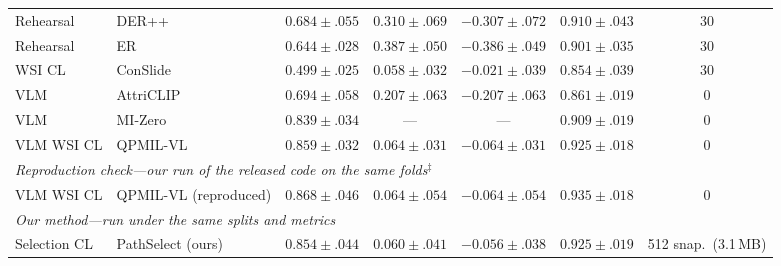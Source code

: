 \documentclass{article}
\begin{document}
\begin{table}[!t]
\begin{tabular}{llccccc}
Rehearsal & DER++ \cite{buzzega2020derpp} & $0.684{\pm}.055$ & $0.310{\pm}.069$ & $-0.307{\pm}.072$ & $0.910{\pm}.043$ & 30 \\
Rehearsal & ER \cite{chaudhry2019er} & $0.644{\pm}.028$ & $0.387{\pm}.050$ & $-0.386{\pm}.049$ & $0.901{\pm}.035$ & 30 \\
WSI CL & ConSlide \cite{huang2023conslide} & $0.499{\pm}.025$ & $0.058{\pm}.032$ & $-0.021{\pm}.039$ & $0.854{\pm}.039$ & 30 \\
VLM & AttriCLIP \cite{wang2023attriclip} & $0.694{\pm}.058$ & $0.207{\pm}.063$ & $-0.207{\pm}.063$ & $0.861{\pm}.019$ & 0 \\
VLM & MI-Zero \cite{lu2023mizero} & $0.839{\pm}.034$ & --- & --- & $0.909{\pm}.019$ & 0 \\
VLM WSI CL & QPMIL-VL \cite{gou2025qpmil} & $0.859{\pm}.032$ & $0.064{\pm}.031$ & $-0.064{\pm}.031$ & $0.925{\pm}.018$ & 0 \\
\midrule
\multicolumn{7}{l}{\emph{Reproduction check---our run of the released code on the same folds$^\ddagger$}} \\
VLM WSI CL & QPMIL-VL (reproduced) & $0.868{\pm}.046$ & $0.064{\pm}.054$ & $-0.064{\pm}.054$ & $0.935{\pm}.018$ & 0 \\
\midrule
\multicolumn{7}{l}{\emph{Our method---run under the same splits and metrics}} \\
Selection CL & PathSelect (ours) & $0.854{\pm}.044$ & $0.060{\pm}.041$ & $-0.056{\pm}.038$ & $0.925{\pm}.019$ & 512 snap.\ (3.1\,MB) \\
\bottomrule
\end{tabular}
\end{table}
\end{document}
